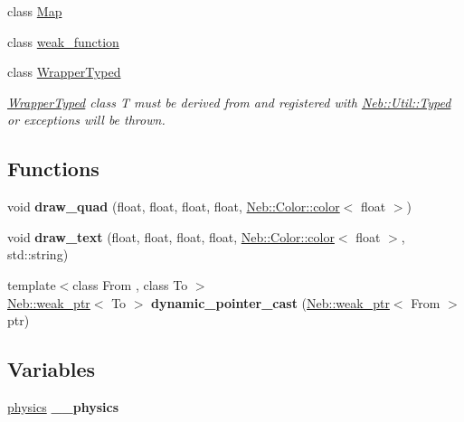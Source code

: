 \begin{DoxyCompactItemize}
class \hyperlink{classNeb_1_1Map}{Map}
\item 
class \hyperlink{classNeb_1_1weak__function}{weak\-\_\-function}
\item 
class \hyperlink{classNeb_1_1WrapperTyped}{Wrapper\-Typed}
\begin{DoxyCompactList}\small\item\em \hyperlink{classNeb_1_1WrapperTyped}{Wrapper\-Typed} class T must be derived from and registered with \hyperlink{classNeb_1_1Util_1_1Typed}{Neb\-::\-Util\-::\-Typed} or exceptions will be thrown. \end{DoxyCompactList}\end{DoxyCompactItemize}
\subsection*{Functions}
\begin{DoxyCompactItemize}
\item 
\hypertarget{namespaceNeb_a8ebdfeffa1def13492f72074015c2876}{void {\bfseries draw\-\_\-quad} (float, float, float, float, \hyperlink{classNeb_1_1Color_1_1color}{Neb\-::\-Color\-::color}$<$ float $>$)}\label{namespaceNeb_a8ebdfeffa1def13492f72074015c2876}

\item 
\hypertarget{namespaceNeb_a7daf427c7b6f28a6da236451dc42f6d1}{void {\bfseries draw\-\_\-text} (float, float, float, float, \hyperlink{classNeb_1_1Color_1_1color}{Neb\-::\-Color\-::color}$<$ float $>$, std\-::string)}\label{namespaceNeb_a7daf427c7b6f28a6da236451dc42f6d1}

\item 
\hypertarget{namespaceNeb_a4ed152a7fe9e22a11580d60f1d14b2d2}{{\footnotesize template$<$class From , class To $>$ }\\\hyperlink{classNeb_1_1weak__ptr}{Neb\-::weak\-\_\-ptr}$<$ To $>$ {\bfseries dynamic\-\_\-pointer\-\_\-cast} (\hyperlink{classNeb_1_1weak__ptr}{Neb\-::weak\-\_\-ptr}$<$ From $>$ ptr)}\label{namespaceNeb_a4ed152a7fe9e22a11580d60f1d14b2d2}

\end{DoxyCompactItemize}
\subsection*{Variables}
\begin{DoxyCompactItemize}
\item 
\hypertarget{namespaceNeb_a16bff826fe3b967c09a5f37850d60ee5}{\hyperlink{classNeb_1_1physics}{physics} {\bfseries \-\_\-\-\_\-physics}}\label{namespaceNeb_a16bff826fe3b967c09a5f37850d60ee5}

\end{DoxyCompactItemize}


